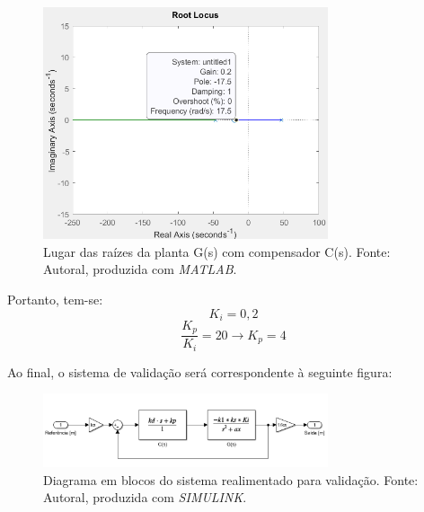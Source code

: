\documentclass{ifacconf}
\begin{document}
\begin{figure}[!htb]
  \begin{center}
  \includegraphics[width=8.4cm]{figures/rlocus2.png}    %
  \caption{Lugar das raízes da planta G(s) com compensador C(s). Fonte: Autoral, produzida com \textit{MATLAB}.} 
  \label{fig:rlocus2}
  \end{center}
\end{figure}

Portanto, tem-se:
\begin{equation}
    K_i = 0,2
\end{equation}
\begin{equation}
    \frac{K_p}{K_i} = 20 \rightarrow K_p = 4
\end{equation}

Ao final, o sistema de validação será correspondente à seguinte figura:
\begin{figure}[!htb]
  \begin{center}
  \includegraphics[width=8.4cm]{figures/diagramaPDvalidacao.png}    %
  \caption{Diagrama em blocos do sistema realimentado para validação. Fonte: Autoral, produzida com \textit{SIMULINK}.} 
  \label{fig:validacao}
  \end{center}
\end{figure}
\end{document}

